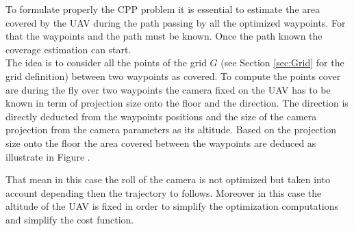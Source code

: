 To formulate properly the CPP problem it is essential to estimate the area covered by the UAV during the path passing by all the optimized waypoints. For that the waypoints and the path must be known. 
 Once the path known the coverage estimation can start. \\
 The idea is to consider all the points of the grid $G$ (see Section \ref{sec:Grid} for the grid definition) between two waypoints as covered. To compute the points cover are during the fly over two waypoints the camera fixed on the UAV has to be known in term of projection size onto the floor and the direction. %
  The direction is directly deducted from the waypoints positions and the size of the camera projection from the camera parameters as its altitude. %
  Based on the projection size onto the floor the area covered between the waypoints are deduced as illustrate in Figure .

 
 That mean in this case the roll of the camera is not optimized but taken into account depending then the trajectory to follows. Moreover in this case the altitude of the UAV is fixed in order to simplify the optimization computations and simplify the cost function.

